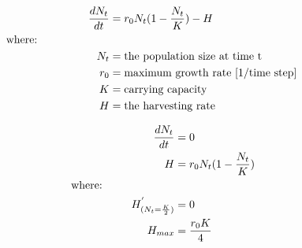 \documentclass[12pt]{article}
\begin{document}
\begin{align}
\dfrac{dN_{t}}{dt} & = r_{0} N_{t} (1 - \frac{N_{t}}{K}) -H \nonumber \\
&    \hspace{-1.3in}  \text{where:} \nonumber \\
N_{t} & = \text{the population size at time t} \nonumber \\
r_{0} & = \text{maximum growth rate [1/time step]} \nonumber \\
K & = \text{carrying capacity} \nonumber\\
H & = \text{the harvesting rate} \nonumber
\end{align} 


\begin{align}
\dfrac{dN_{t}}{dt} & = 0 \nonumber \\
H & = r_{0} N_{t} (1 - \frac{N_{t}}{K}) \nonumber \\
&    \hspace{-1.3in}  \text{where:} \nonumber \\
H^{'}_{(N_{t} =\frac{K}{2})} & = 0 \nonumber \\
H_{max} & = \frac{r_{0}K}{4} \nonumber
\end{align} 
\end{document}
